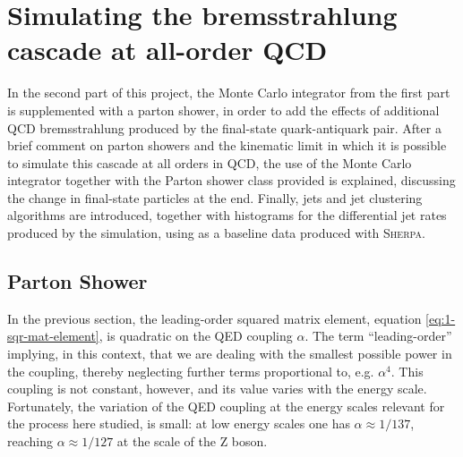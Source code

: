 \section{Simulating the bremsstrahlung cascade at all-order QCD}

In the second part of this project, the Monte Carlo integrator from the first part is supplemented with a parton shower, in order to add the effects of additional QCD bremsstrahlung produced by the final-state quark-antiquark pair. After a brief comment on parton showers and the kinematic limit in which it is possible to simulate this cascade at all orders in QCD, the use of the Monte Carlo integrator together with the Parton shower class provided is explained, discussing the change in final-state particles at the end. Finally, jets and jet clustering algorithms are introduced, together with histograms for the differential jet rates produced by the simulation, using as a baseline data produced with \textsc{Sherpa}.

\subsection{Parton Shower}

In the previous section, the leading-order squared matrix element, equation \eqref{eq:1-sqr-mat-element}, is quadratic on the QED coupling $\alpha$. The term “leading-order” implying, in this context, that we are dealing with the smallest possible power in the coupling, thereby neglecting further terms proportional to, e.g. $\alpha^{4}$. This coupling is not constant, however, and its value varies with the energy scale. Fortunately, the variation of the QED coupling at the energy scales relevant for the process here studied, is small: at low energy scales one has $\alpha \approx 1/137$, reaching $\alpha \approx 1 / 127$ at the scale of the Z boson.

